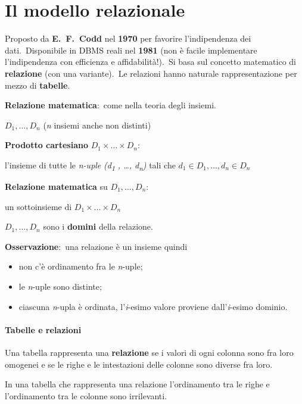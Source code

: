 \chapter{Il modello relazionale}

Proposto da \textbf{E.\ F.\ Codd} nel \textbf{1970} per favorire l'indipendenza dei dati.\
Disponibile in DBMS reali nel \textbf{1981} (non è facile implementare l'indipendenza con efficienza e affidabilità!).\
Si basa sul concetto matematico di \textbf{relazione} (con una variante).\
Le relazioni hanno naturale rappresentazione per mezzo di \textbf{tabelle}.

\noindent \textbf{Relazione matematica}:\ come nella teoria degli insiemi.
\begin{center}
	$D_1, \dots, D_n$ (\textit{n} insiemi anche non distinti)
\end{center}
\textbf{Prodotto cartesiano} $D_1 \times \dots \times D_n$:
\begin{center}
	l'insieme di tutte le \textit{n-uple} \textit{(d\textsubscript{1} , \dots, d\textsubscript{n})} tali che $d_1 \in D_1 , \dots, d_n \in D_n$
\end{center}
\textbf{Relazione matematica} su $D_1, \dots, D_n$:
\begin{center}
	un sottoinsieme di $D_1 \times \dots \times D_n$
\end{center}
$D_1, \dots, D_n$ sono i \textbf{domini} della relazione.

\textbf{Osservazione}:\ una relazione è un insieme quindi
\begin{itemize}
	\item non c'è ordinamento fra le \textit{n}-uple;
	\item le \textit{n}-uple sono distinte;
	\item ciascuna \textit{n}-upla è ordinata, l'\textit{i}-esimo valore proviene dall'\textit{i}-esimo dominio.
\end{itemize}

\subsubsection{Tabelle e relazioni}

Una tabella rappresenta una \textbf{relazione} se i valori di ogni colonna sono fra loro omogenei e se le righe e le intestazioni delle colonne sono diverse fra loro.

In una tabella che rappresenta una relazione l'ordinamento tra le righe e l'ordinamento tra le colonne sono irrilevanti.

